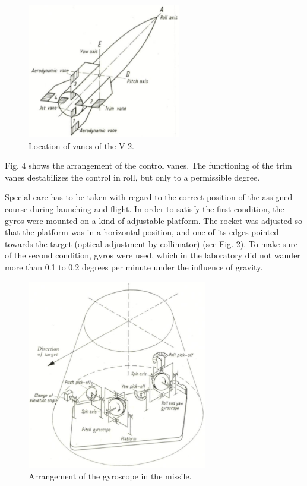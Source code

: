 \documentclass[12pt, a4paper]{article}
\begin{document}
\begin{figure}[ht]
  \centering
  \includegraphics[width=0.6\textwidth]{figs/ctrl-04.png}
  \caption{Location of vanes of the V-2.}
  \label{fig:04}
\end{figure}

Fig. 4 shows the arrangement of the control vanes. The functioning of the trim vanes destabilizes the control in roll, but only to a permissible degree.

Special care has to be taken with regard to the correct position of the assigned course during launching and flight. In order to satisfy the first condition, the gyros were mounted on a kind of adjustable platform. The rocket was adjusted so that the platform was in a horizontal position, and one of its edges pointed towards the target (optical adjustment by collimator) (see Fig. \ref{fig:05}). To make sure of the second condition, gyros were used, which in the laboratory did not wander more than 0.1 to 0.2 degrees per minute under the influence of gravity.

\begin{figure}[ht]
  \centering
  \includegraphics[width=0.7\textwidth]{figs/ctrl-05.png}
  \caption{Arrangement of the gyroscope in the missile.}
  \label{fig:05}
\end{figure}
\end{document}
